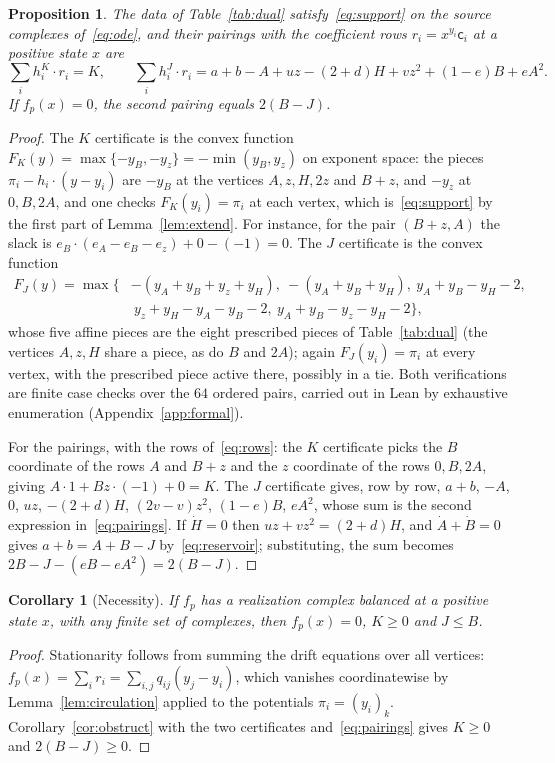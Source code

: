 \documentclass[11pt,a4paper]{article}
\theoremstyle{plain}
\newtheorem{proposition}[theorem]{Proposition}
\newtheorem{corollary}[theorem]{Corollary}
\theoremstyle{definition}
\theoremstyle{remark}
\newcommand{\cc}{\mathsf{c}}
\begin{document}
\begin{proposition}\label{prop:certificates}
The data of Table~\ref{tab:dual} satisfy~\eqref{eq:support} on the source complexes of~\eqref{eq:ode}, and their pairings with the coefficient rows $r_i=x^{y_i}\cc_i$ at a positive state $x$ are
\begin{equation}\label{eq:pairings}
\sum_ih_i^K\cdot r_i=K,\qquad
\sum_ih_i^J\cdot r_i=a+b-A+uz-(2+d)H+vz^2+(1-e)B+eA^2 .
\end{equation}
If $f_p(x)=0$, the second pairing equals $2(B-J)$.
\end{proposition}
\begin{proof}
The $K$ certificate is the convex function $F_K(y)=\max\{-y_B,-y_z\}=-\min(y_B,y_z)$ on exponent space: the pieces $\pi_i-h_i\cdot(y-y_i)$ are $-y_B$ at the vertices $A,z,H,2z$ and $B+z$, and $-y_z$ at $0,B,2A$, and one checks $F_K(y_i)=\pi_i$ at each vertex, which is~\eqref{eq:support} by the first part of Lemma~\ref{lem:extend}. For instance, for the pair $(B+z,A)$ the slack is $e_B\cdot(e_A-e_B-e_z)+0-(-1)=0$. The $J$ certificate is the convex function
\begin{align*}
F_J(y)=\max\bigl\{&-(y_A+y_B+y_z+y_H),\ -(y_A+y_B+y_H),\ y_A+y_B-y_H-2,\\
&\ y_z+y_H-y_A-y_B-2,\ y_A+y_B-y_z-y_H-2\bigr\},
\end{align*}
whose five affine pieces are the eight prescribed pieces of Table~\ref{tab:dual} (the vertices $A,z,H$ share a piece, as do $B$ and $2A$); again $F_J(y_i)=\pi_i$ at every vertex, with the prescribed piece active there, possibly in a tie. Both verifications are finite case checks over the $64$ ordered pairs, carried out in Lean by exhaustive enumeration (Appendix~\ref{app:formal}).

For the pairings, with the rows of~\eqref{eq:rows}: the $K$ certificate picks the $B$ coordinate of the rows $A$ and $B+z$ and the $z$ coordinate of the rows $0,B,2A$, giving $A\cdot1+Bz\cdot(-1)+0=K$. The $J$ certificate gives, row by row, $a+b$, $-A$, $0$, $uz$, $-(2+d)H$, $(2v-v)z^2$, $(1-e)B$, $eA^2$, whose sum is the second expression in~\eqref{eq:pairings}. If $\dot H=0$ then $uz+vz^2=(2+d)H$, and $\dot A+\dot B=0$ gives $a+b=A+B-J$ by~\eqref{eq:reservoir}; substituting, the sum becomes $2B-J-(eB-eA^2)=2(B-J)$.
\end{proof}

\begin{corollary}[Necessity]\label{cor:necessity}
If $f_p$ has a realization complex balanced at a positive state $x$, with any finite set of complexes, then $f_p(x)=0$, $K\ge0$ and $J\le B$.
\end{corollary}
\begin{proof}
Stationarity follows from summing the drift equations over all vertices: $f_p(x)=\sum_ir_i=\sum_{i,j}q_{ij}(y_j-y_i)$, which vanishes coordinatewise by Lemma~\ref{lem:circulation} applied to the potentials $\pi_i=(y_i)_k$. Corollary~\ref{cor:obstruct} with the two certificates and~\eqref{eq:pairings} gives $K\ge0$ and $2(B-J)\ge0$.
\end{proof}
\end{document}

